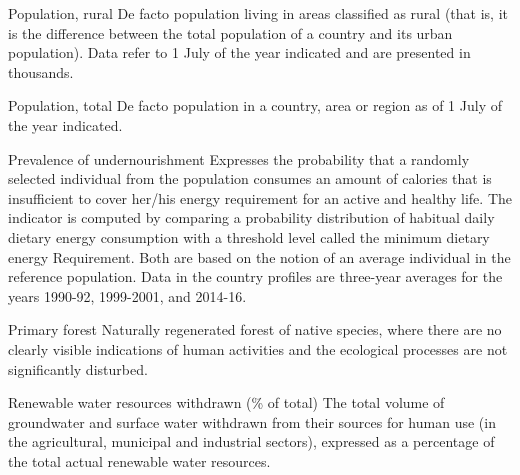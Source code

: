 \begin{MetadataCollection} {}
\begin{metadata}{Population, rural} {}
De facto population living in areas classified as rural (that is, it is the difference between the total population of a country and its urban population). Data refer to 1 July of the year indicated and are presented in thousands.
\end{metadata}

\begin{metadata}{Population, total} {}
De facto population in a country, area or region as of 1 July of the year indicated.
\end{metadata}

\begin{metadata}{Prevalence of undernourishment} {}
Expresses the probability that a randomly selected individual from the population consumes an amount of calories that is insufficient to cover her/his energy requirement for an active and healthy life. The indicator is computed by comparing a probability distribution of habitual daily dietary energy consumption with a threshold level called the minimum dietary energy Requirement. Both are based on the notion of an average individual in the reference population. Data in the country profiles are three-year averages for the years 1990-92, 1999-2001, and 2014-16.
\end{metadata}

\begin{metadata}{Primary forest} {}
Naturally regenerated forest of native species, where there are no clearly visible indications of human activities and the ecological processes are not significantly disturbed.
\end{metadata}

\begin{metadata}{Renewable water resources withdrawn (\% of total)} {}
The total volume of groundwater and surface water withdrawn from their sources for human use (in the agricultural, municipal and industrial sectors), expressed as a percentage of the total actual renewable water resources.
\end{metadata}


\end{MetadataCollection}
